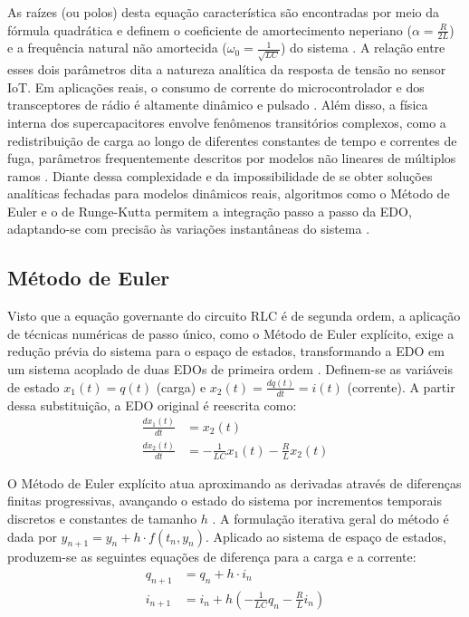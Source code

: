 \documentclass[12pt, a4paper]{article}
\begin{document}
As raízes (ou polos) desta equação característica são encontradas por meio da fórmula quadrática e definem o coeficiente de amortecimento neperiano ($\alpha = \frac{R}{2L}$) e a frequência natural não amortecida ($\omega_0 = \frac{1}{\sqrt{LC}}$) do sistema \cite{shaikh2022, kafle2025}. A relação entre esses dois parâmetros dita a natureza analítica da resposta de tensão no sensor IoT. Em aplicações reais, o consumo de corrente do microcontrolador e dos transceptores de rádio é altamente dinâmico e pulsado \cite{modelagem2026}. Além disso, a física interna dos supercapacitores envolve fenômenos transitórios complexos, como a redistribuição de carga ao longo de diferentes constantes de tempo e correntes de fuga, parâmetros frequentemente descritos por modelos não lineares de múltiplos ramos \cite{gekakis2015}. Diante dessa complexidade e da impossibilidade de se obter soluções analíticas fechadas para modelos dinâmicos reais, algoritmos como o Método de Euler e o de Runge-Kutta permitem a integração passo a passo da EDO, adaptando-se com precisão às variações instantâneas do sistema \cite{modelagem2026, igwe2025}.

\subsection{Método de Euler}
Visto que a equação governante do circuito RLC é de segunda ordem, a aplicação de técnicas numéricas de passo único, como o Método de Euler explícito, exige a redução prévia do sistema para o espaço de estados, transformando a EDO em um sistema acoplado de duas EDOs de primeira ordem \cite{aselebe2026, qi2026}. Definem-se as variáveis de estado $x_1(t) = q(t)$ (carga) e $x_2(t) = \frac{dq(t)}{dt} = i(t)$ (corrente). A partir dessa substituição, a EDO original é reescrita como:
\begin{align}
    \frac{dx_1(t)}{dt} &= x_2(t) \\
    \frac{dx_2(t)}{dt} &= -\frac{1}{LC} x_1(t) - \frac{R}{L} x_2(t)
\end{align}

O Método de Euler explícito atua aproximando as derivadas através de diferenças finitas progressivas, avançando o estado do sistema por incrementos temporais discretos e constantes de tamanho $h$ \cite{aselebe2026}. A formulação iterativa geral do método é dada por $y_{n+1} = y_n + h \cdot f(t_n, y_n)$. Aplicado ao sistema de espaço de estados, produzem-se as seguintes equações de diferença para a carga e a corrente:
\begin{align}
    q_{n+1} &= q_n + h \cdot i_n \\
    i_{n+1} &= i_n + h \left( -\frac{1}{LC} q_n - \frac{R}{L} i_n \right)
\end{align}
\end{document}
